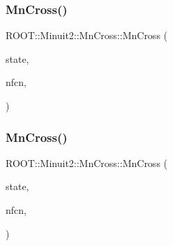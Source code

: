\subsubsection{\texorpdfstring{MnCross()}{MnCross()}\hspace{0.1cm}{\footnotesize\ttfamily [6/16]}}
{\footnotesize\ttfamily R\+O\+O\+T\+::\+Minuit2\+::\+Mn\+Cross\+::\+Mn\+Cross (\begin{DoxyParamCaption}\item[{const \mbox{\hyperlink{classROOT_1_1Minuit2_1_1MnUserParameterState}{Mn\+User\+Parameter\+State}} \&}]{state,  }\item[{unsigned int}]{nfcn,  }\item[{\mbox{\hyperlink{classROOT_1_1Minuit2_1_1MnCross_1_1CrossFcnLimit}{Cross\+Fcn\+Limit}}}]{ }\end{DoxyParamCaption})\hspace{0.3cm}{\ttfamily [inline]}}

\mbox{\label{classROOT_1_1Minuit2_1_1MnCross_a8508fcf20167952cb8f53427d348e2dc}} 
\subsubsection{\texorpdfstring{MnCross()}{MnCross()}\hspace{0.1cm}{\footnotesize\ttfamily [7/16]}}
{\footnotesize\ttfamily R\+O\+O\+T\+::\+Minuit2\+::\+Mn\+Cross\+::\+Mn\+Cross (\begin{DoxyParamCaption}\item[{const \mbox{\hyperlink{classROOT_1_1Minuit2_1_1MnUserParameterState}{Mn\+User\+Parameter\+State}} \&}]{state,  }\item[{unsigned int}]{nfcn,  }\item[{\mbox{\hyperlink{classROOT_1_1Minuit2_1_1MnCross_1_1CrossNewMin}{Cross\+New\+Min}}}]{ }\end{DoxyParamCaption})\hspace{0.3cm}{\ttfamily [inline]}}

\mbox{\label{classROOT_1_1Minuit2_1_1MnCross_a34f9825f828387bc92e6e7aaac8ced84}} 
